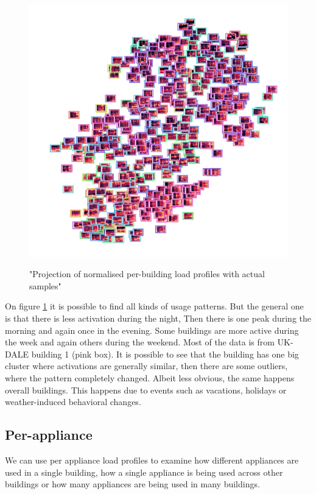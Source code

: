\begin{figure}[H]
	\centering
	\caption{"Projection of normalised per-building load profiles with actual samples"}
	\includegraphics[width=.9\textwidth]{Figures/TSNE/TSNE_per_building/all/img_scatter_allall.png}
	\label{fig:tsne_pb_img_norm_scatter_allall}
\end{figure}

On figure \ref{fig:tsne_pb_img_norm_scatter_allall} it is possible to find all kinds of 
usage patterns. But the general one is that there is less activation during the night,
Then there is one peak during the morning and again once in the evening.
Some buildings are more active during the week and again others during the weekend.
Most of the data is from UK-DALE building 1 (pink box). It is possible to see that the building
has one big cluster where activations are generally similar, then there are some outliers,
where the pattern completely changed. Albeit less obvious, the same happens overall buildings.
This happens due to events such as vacations, holidays or weather-induced behavioral changes.

\subsection{Per-appliance}

We can use per appliance load profiles to examine how different appliances 
are used in a single building, how a single appliance is being used across other buildings
or how many appliances are being used in many buildings.

